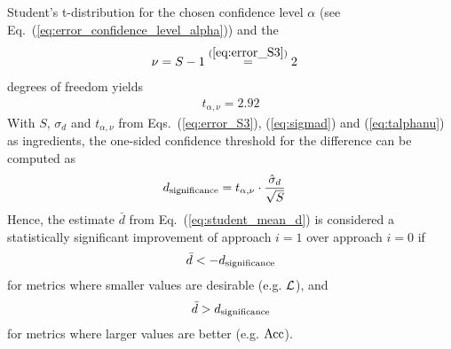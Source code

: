 Student's t-distribution for the chosen confidence level $\alpha$ (see Eq.~(\ref{eq:error_confidence_level_alpha})) and the
\begin{align}
\nu &= S - 1 \stackrel{(\ref{eq:error_S3})}{=} 2 
\end{align}
degrees of freedom yields
\begin{align}
t_{\alpha, \nu} = 2.92
\label{eq:talphanu}
\end{align}
With $S$, $\sigma_d$ and $t_{\alpha, \nu}$ from Eqs.~(\ref{eq:error_S3}), (\ref{eq:sigmad}) and (\ref{eq:talphanu}) as ingredients, the one-sided confidence threshold for the difference can be computed as
\begin{align}
d_{\rm significance}
&= t_{\alpha, \nu} \cdot \frac{\hat \sigma_d}{\sqrt{S}}
\label{eq:studentonesidedconfidencethreshold}
\end{align}
Hence, the estimate $\bar d$ from Eq.~(\ref{eq:student_mean_d}) is considered a statistically significant improvement of approach $i=1$ over approach $i=0$ if
\begin{align}
\bar d < - d_{\rm significance}
\label{eq:student_signficance_loss}
\end{align}
for metrics where smaller values are desirable (e.g. $\mathcal{L}$), and 
\begin{align}
\bar d > d_{\rm significance}
\label{eq:student_signficance_other}
\end{align}
for metrics where larger values are better (e.g. $\rm Acc$).
